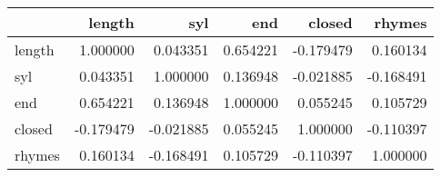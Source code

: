 \begin{tabular}{|lrrrrr}
\toprule
 & length & syl & end & closed & rhymes \\
\midrule
length & 1.000000 & 0.043351 & 0.654221 & -0.179479 & 0.160134 \\
syl & 0.043351 & 1.000000 & 0.136948 & -0.021885 & -0.168491 \\
end & 0.654221 & 0.136948 & 1.000000 & 0.055245 & 0.105729 \\
closed & -0.179479 & -0.021885 & 0.055245 & 1.000000 & -0.110397 \\
rhymes & 0.160134 & -0.168491 & 0.105729 & -0.110397 & 1.000000 \\
\bottomrule
\end{tabular}
